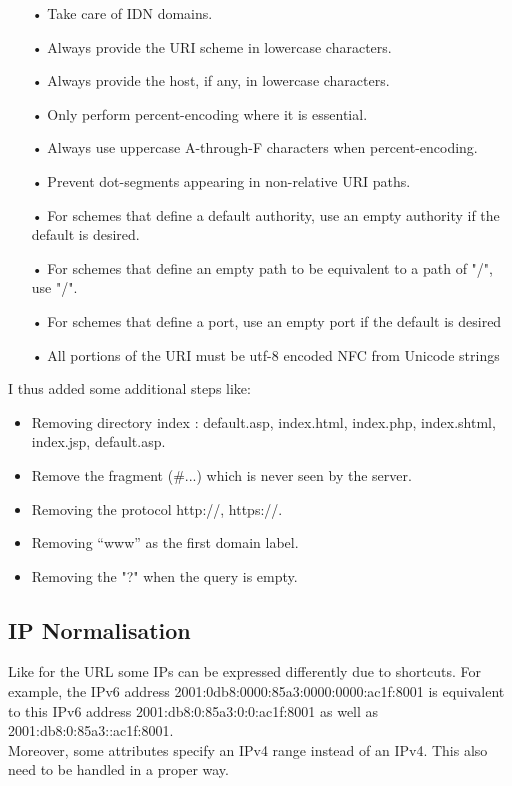 \documentclass{eplmastersthesis}
\begin{document}
\begin{itemize}
\item[•] Take care of IDN domains.
\item[•] Always provide the URI scheme in lowercase characters.
\item[•] Always provide the host, if any, in lowercase characters.
\item[•] Only perform percent-encoding where it is essential.
\item[•] Always use uppercase A-through-F characters when percent-encoding.
\item[•] Prevent dot-segments appearing in non-relative URI paths.
\item[•] For schemes that define a default authority, use an empty authority if the default is desired.
\item[•] For schemes that define an empty path to be equivalent to a path of "/", use "/".
\item[•] For schemes that define a port, use an empty port if the default is desired
\item[•] All portions of the URI must be utf-8 encoded NFC from Unicode strings
\end{itemize}

I thus added some additional steps like:
\begin{itemize}
\item Removing directory index : {default.asp, index.html, index.php, index.shtml, index.jsp, default.asp}.
\item Remove the fragment (\#...) which is never seen by the server.
\item Removing the protocol {http://, https://}.
\item Removing  “www” as the first domain label.
\item Removing the "?" when the query is empty.
\end{itemize}

\subsection{IP Normalisation}
Like for the URL some IPs can be expressed differently due to shortcuts. For example, the IPv6 address 2001:0db8:0000:85a3:0000:0000:ac1f:8001 is equivalent to this IPv6 address 2001:db8:0:85a3:0:0:ac1f:8001 as well as 2001:db8:0:85a3::ac1f:8001.\\
Moreover, some attributes specify an IPv4 range instead of an IPv4. This also need to be handled in a proper way.\\
\end{document}
